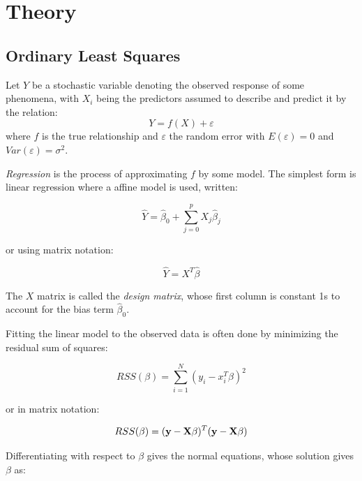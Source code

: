 \section{Theory}\label{sec:Theory}

\subsection{Ordinary Least Squares}\label{subsec:OLS}

Let \(Y\) be a stochastic variable denoting the observed response of some
phenomena, with \(X_{i}\) being the predictors assumed to describe and predict
it by the relation:
\begin{equation*}
  Y = f(X) + \varepsilon
\end{equation*}
where \(f\) is the true relationship and \(\varepsilon\) the random error
with \(E(\varepsilon) = 0\) and \(Var(\varepsilon) = \sigma^{2}\).

\textit{Regression} is the process of approximating \(f\)
by some model. The simplest form is linear regression where a affine model is
used, written:

\begin{equation*}
  \hat{Y} = \hat\beta_{0} + \sum_{j=0}^{p}X_{j}\hat\beta_{j}
\end{equation*}

or using matrix notation:

\begin{equation*}
  \hat{Y} = X^{T}\hat\beta
\end{equation*}

The \(X\) matrix is called the \textit{design matrix}, whose first column is
constant 1s to account for the bias term \(\hat\beta_{0}\).

Fitting the linear model to the observed data is often done by minimizing the
residual sum of squares:

\begin{equation*}
  RSS(\beta) = \sum_{i=1}^{N} \left( y_{i} - x_{i}^{T}\beta \right)^{2}
\end{equation*}

or in matrix notation:

\begin{equation*}
  RSS(\beta) = (\vb{y} - \vb{X}\beta)^{T}(\vb{y} - \vb{X}\beta)
\end{equation*}

Differentiating with respect to \(\beta\) gives the normal equations, whose
solution gives \(\beta\) as:


